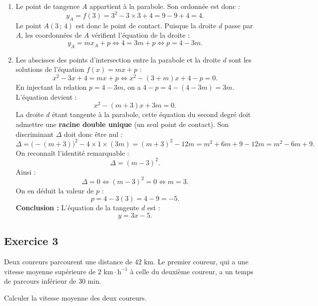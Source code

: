 \documentclass[11pt,a4paper]{article}
\begin{document}
\begin{correctionbox}
\begin{enumerate}
    \item Le point de tangence $A$ appartient à la parabole. Son ordonnée est donc :
    \[
    y_A = f(3) = 3^2 - 3 \times 3 + 4 = 9 - 9 + 4 = 4.
    \]
    Le point $A(3\,;\,4)$ est donc le point de contact. Puisque la droite $d$ passe par $A$, les coordonnées de $A$ vérifient l'équation de la droite :
    \[
    y_A = m x_A + p \iff 4 = 3m + p \iff p = 4 - 3m.
    \]
    \item Les abscisses des points d'intersection entre la parabole et la droite $d$ sont les solutions de l'équation $f(x) = mx + p$ :
    \[
    x^2 - 3x + 4 = mx + p \iff x^2 - (3+m)x + 4 - p = 0.
    \]
    En injectant la relation $p = 4 - 3m$, on a $4 - p = 4 - (4 - 3m) = 3m$. L'équation devient :
    \[
    x^2 - (m+3)x + 3m = 0.
    \]
    La droite $d$ étant tangente à la parabole, cette équation du second degré doit admettre une \textbf{racine double unique} (un seul point de contact). Son discriminant $\Delta$ doit donc être nul :
    \[
    \Delta = \bigl(-(m+3)\bigr)^2 - 4 \times 1 \times (3m) = (m+3)^2 - 12m = m^2 + 6m + 9 - 12m = m^2 - 6m + 9.
    \]
    On reconnaît l'identité remarquable :
    \[
    \Delta = (m - 3)^2.
    \]
    Ainsi :
    \[
    \Delta = 0 \iff (m-3)^2 = 0 \iff m = 3.
    \]
    On en déduit la valeur de $p$ :
    \[
    p = 4 - 3(3) = 4 - 9 = -5.
    \]
    \textbf{Conclusion :} L'équation de la tangente $d$ est :
    \[
    y = 3x - 5.
    \]
\end{enumerate}
\end{correctionbox}

\subsection*{Exercice 3}
Deux coureurs parcourent une distance de $42\text{~km}$. Le premier coureur, qui a une vitesse moyenne supérieure de $2\text{~km}\cdot\text{h}^{-1}$ à celle du deuxième coureur, a un temps de parcours inférieur de $30\text{~min}$.

Calculer la vitesse moyenne des deux coureurs.
\end{document}
